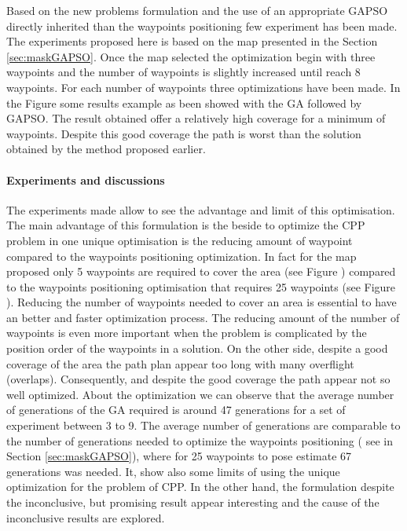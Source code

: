 		
	Based on the new problems formulation and the use of an appropriate GAPSO directly inherited than the waypoints positioning few experiment has been made. The experiments proposed here is based on the map presented in the Section \ref{sec:maskGAPSO}.
  Once the map selected the optimization begin with three waypoints and the number of waypoints is slightly increased until reach 8 waypoints. For each number of waypoints  three optimizations have been made. In the Figure  some results example as been showed with the GA followed  by GAPSO. The result obtained offer a relatively high coverage for a minimum of waypoints. Despite this good coverage the path is worst than the solution obtained by the method proposed earlier.  

	\paragraph*{Experiments and discussions}	
The experiments made allow to see the advantage and limit of this optimisation. 
The main advantage of this formulation is the beside to optimize the CPP problem in one unique optimisation is the reducing amount of waypoint compared to the waypoints positioning optimization. In fact for the map proposed only  5 waypoints are required to cover  the area (see Figure ) compared to the waypoints positioning optimisation that requires 25 waypoints (see Figure ). Reducing the number of waypoints needed to cover an area is essential to have an better and faster optimization process. The reducing amount of the number of waypoints is even more important when the problem is complicated by the position order of the waypoints in a solution. 
	On the other side, despite a good coverage of the area the path plan appear too long with many overflight (overlaps). Consequently, and despite the good  coverage the path appear not so well optimized. 
	About the optimization we can observe that the average number of generations of the GA required is around 47 generations for a set of experiment between 3 to 9. The average number of generations  are  comparable to the number of generations needed to optimize the waypoints positioning ( see in Section \ref{sec:maskGAPSO}), where for 25 waypoints to pose estimate 67 generations was needed. 
	It, show also some limits of using the unique optimization for the problem of CPP. In the other hand, the formulation despite the inconclusive, but promising result appear interesting and the cause of the inconclusive results are explored.
	
